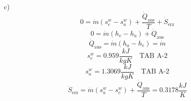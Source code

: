 c) 
\[
0 = \dot{m}(s_e^w - s_a^w) + \frac{\dot{Q}_{\text{aus}}}{T} + \dot{S}_{\text{erz}}
\]
\[
0 = \dot{m}(h_e - h_a) + \dot{Q}_{\text{aus}}
\]
\[
\dot{Q}_{\text{aus}} = \dot{m}(h_a - h_e) = \dot{m}
\]
\[
s_e^w = 0.959 \frac{kJ}{kgK} \quad \text{TAB A-2}
\]
\[
s_a^w = 1.3069 \frac{kJ}{kgK} \quad \text{TAB A-2}
\]
\[
\dot{S}_{\text{erz}} = \dot{m}(s_a^w - s_e^w) + \frac{\dot{Q}_{\text{aus}}}{T} = 0.3178 \frac{kJ}{K}
\]